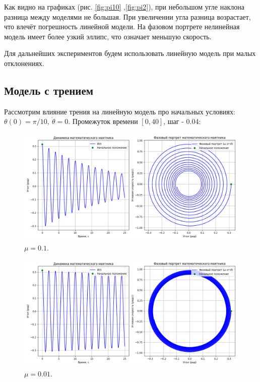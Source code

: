 Как видно на графиках (рис. \ref{fig:pi10} ,\ref{fig:pi2}), при небольшом угле наклона разница между моделями не большая. При увеличении угла разница возрастает, что влечёт погрешность линейной модели. На фазовом портрете нелинейная модель имеет более узкий эллипс, что означает меньшую скорость. 

Для дальнейших экспериментов будем использовать линейную модель при малых отклонениях.

\newpage
\subsection*{Модель с трением}
Рассмотрим влияние трения на линейную модель про начальных условиях: $\theta(0) = \pi /10, \ \dot{\theta} = 0$. Промежуток времени $[0,40]$, шаг - 0.04:
\begin{figure}[h]  %
	\centering
	\includegraphics[width=1\textwidth]{imgs/lin_mu01.png}  %
	\caption{$\mu = 0.1$.}  %
	\label{fig:mu_01}  %
\end{figure}

\begin{figure}[h]  %
	\centering
	\includegraphics[width=1\textwidth]{imgs/lin_mu001.png}  %
	\caption{$\mu = 0.01$.}  %
	\label{fig:mu_001}  %
\end{figure}

